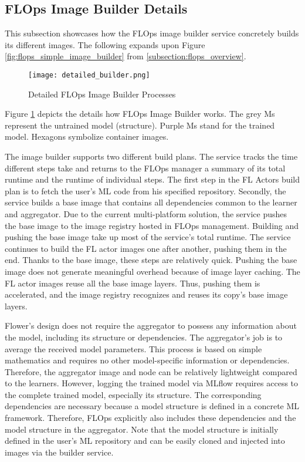 \subsection{FLOps Image Builder Details}

This subsection showcases how the FLOps image builder service concretely builds its different images.
The following expands upon Figure \ref{fig:flops_simple_image_builder} from \ref{subsection:flops_overview}.

\begin{figure}[p]
    \begin{adjustwidth}{-0.1\paperwidth}{-0.1\paperwidth}
        \centering
        \texttt{[image: detailed\_builder.png]}
        \caption{Detailed FLOps Image Builder Processes}
        \label{fig:detailed_builder}
    \end{adjustwidth}
\end{figure}

Figure \ref{fig:detailed_builder} depicts the details how FLOps Image Builder works.
The grey Ms represent the untrained model (structure).
Purple Ms stand for the trained model.
Hexagons symbolize container images.

The image builder supports two different build plans.
The service tracks the time different steps take and returns to the FLOps manager a summary of its total runtime and the runtime of individual steps.
The first step in the FL Actors build plan is to fetch the user's ML code from his specified repository.
Secondly, the service builds a base image that contains all dependencies common to the learner and aggregator.
Due to the current multi-platform solution, the service pushes the base image to the image registry hosted in FLOps management.
Building and pushing the base image take up most of the service's total runtime.
The service continues to build the FL actor images one after another, pushing them in the end.
Thanks to the base image, these steps are relatively quick.
Pushing the base image does not generate meaningful overhead because of image layer caching.
The FL actor images reuse all the base image layers.
Thus, pushing them is accelerated, and the image registry recognizes and reuses its copy's base image layers.

Flower's design does not require the aggregator to possess any information about the model, including its structure or dependencies.
The aggregator's job is to average the received model parameters.
This process is based on simple mathematics and requires no other model-specific information or dependencies.
Therefore, the aggregator image and node can be relatively lightweight compared to the learners.
However, logging the trained model via MLflow requires access to the complete trained model, especially its structure.
The corresponding dependencies are necessary because a model structure is defined in a concrete ML framework.
Therefore, FLOps explicitly also includes these dependencies and the model structure in the aggregator.
Note that the model structure is initially defined in the user's ML repository and can be easily cloned and injected into images via the builder service.

